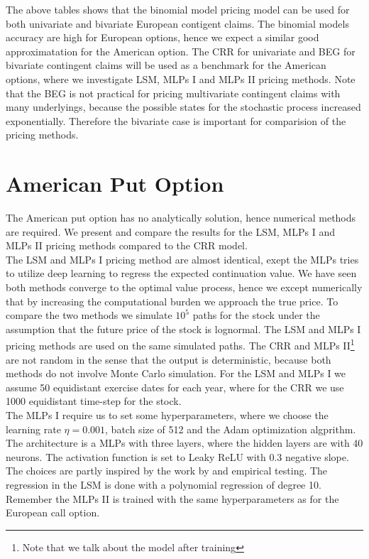 The above tables shows that the binomial model pricing model can be used for both univariate and bivariate European contigent claims. The binomial models accuracy are high for European options, hence we expect a similar good approximatation for the American option. The CRR for univariate and BEG for bivariate contingent claims will be used as a benchmark for the American options, where we investigate LSM, MLPs I and MLPs II pricing methods. Note that the BEG is not practical for pricing multivariate contingent claims with many underlyings, because the possible states for the stochastic process increased exponentially. Therefore the bivariate case is important for comparision of the pricing methods.

\section{American Put Option}
The American put option has no analytically solution, hence numerical methods are required. We present and compare the results for the LSM, MLPs I and MLPs II pricing methods compared to the CRR model.\\

The LSM and MLPs I pricing method are almost identical, exept the MLPs tries to utilize deep learning to regress the expected continuation value. We have seen both methods converge to the optimal value process, hence we except numerically that by increasing the computational burden we approach the true price. To compare the two methods we simulate $10^5$ paths for the stock under the assumption that the future price of the stock is lognormal. The LSM and MLPs I pricing methods are used on the same simulated paths. The CRR and MLPs II\footnote{Note that we talk about the model after training} are not random in the sense that the output is deterministic, because both methods do not involve Monte Carlo simulation. For the LSM and MLPs I we assume 50 equidistant exercise dates for each year, where for the CRR we use 1000 equidistant time-step for the stock.  \\

The MLPs I require us to set some hyperparameters, where we choose the learning rate $\eta=0.001$, batch size of 512 and the Adam optimization algprithm. The architecture is a MLPs with three layers, where the hidden layers are with 40 neurons. The activation function is set to Leaky ReLU with 0.3 negative slope. The choices are partly inspired by the work by \parencite{Lelong19} and empirical testing. The regression in the LSM is done with a polynomial regression of degree 10. Remember the MLPs II is trained with the same hyperparameters as for the European call option.\\

